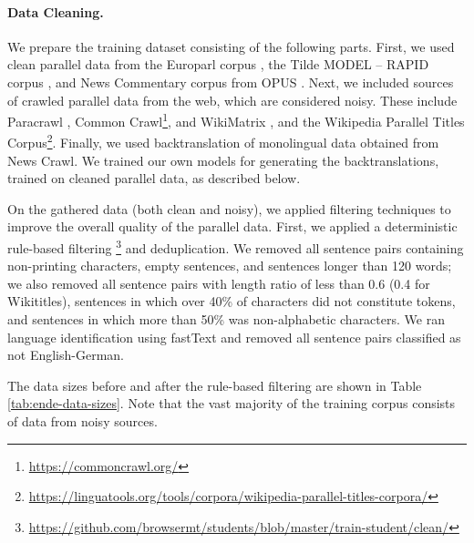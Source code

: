 \paragraph{Data Cleaning.} We prepare the training dataset consisting of the
following parts. First, we used clean parallel data from the Europarl corpus
\citep{koehn-2005-europarl}, the Tilde MODEL -- RAPID corpus
\citep{rozis-skadins-2017-tilde}, and News Commentary corpus from OPUS
\citep{tiedemann-2012-parallel}. Next, we included sources of crawled parallel
data from the web, which are considered noisy. These include Paracrawl
\citep{espla-etal-2019-paracrawl}, Common
Crawl\footnote{\url{https://commoncrawl.org/}}, and WikiMatrix
\citep{schwenk2019wikimatrix}, and the Wikipedia Parallel Titles
Corpus\footnote{\url{https://linguatools.org/tools/corpora/wikipedia-parallel-titles-corpora/}}. Finally,
we used backtranslation \citep{sennrich-etal-2016-improving} of monolingual
data obtained from News Crawl. We trained our own models for generating the
backtranslations, trained on cleaned parallel data, as described below.

On the gathered data (both clean and noisy), we applied filtering techniques to
improve the overall quality of the parallel data. First, we applied a
deterministic rule-based filtering%
\footnote{\url{https://github.com/browsermt/students/blob/master/train-student/clean/}}
and deduplication. We removed all sentence pairs containing non-printing
characters, empty sentences, and sentences longer than 120 words; we also
removed all sentence pairs with length ratio of less than 0.6 (0.4 for
Wikititles), sentences in which over 40\% of characters did not constitute
tokens, and sentences in which more than 50\% was non-alphabetic characters. We
ran language identification using fastText
\citep{joulin-etal-2017-bag,joulin2016fasttext} and removed all sentence pairs
classified as not English-German.

The data sizes before and after the rule-based filtering are shown in Table
\ref{tab:ende-data-sizes}. Note that the vast majority of the training corpus
consists of data from noisy sources.

